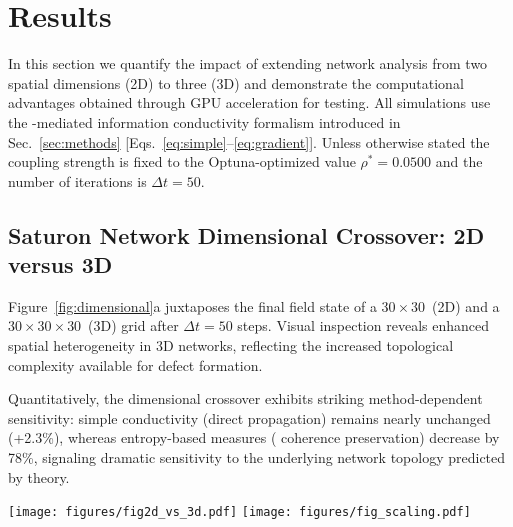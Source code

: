 \section{Results\label{sec:results}}

In this section we quantify the impact of extending \saturon{} network analysis
from two spatial dimensions (2D) to three (3D) and demonstrate the computational 
advantages obtained through GPU acceleration for \posp{} testing. All simulations 
use the \saturon{}-mediated information conductivity formalism introduced in
Sec.~\ref{sec:methods} [Eqs.~\ref{eq:simple}--\ref{eq:gradient}]. Unless otherwise
stated the \saturon{} coupling strength is fixed to the Optuna-optimized value
$\rho^{\ast}=0.0500$ and the number of iterations is $\Delta t=50$.

\subsection{Saturon Network Dimensional Crossover: 2D versus 3D}
Figure~\ref{fig:dimensional}a juxtaposes the final \saturon{} field state of a
$30 \times 30$~(2D) and a $30 \times 30 \times 30$~(3D) grid after
$\Delta t=50$ steps. Visual inspection reveals enhanced spatial heterogeneity 
in 3D \saturon{} networks, reflecting the increased topological complexity 
available for defect formation.

Quantitatively, the dimensional crossover exhibits striking method-dependent 
sensitivity: simple conductivity (direct \saturon{} propagation) remains nearly 
unchanged (+2.3\%), whereas entropy-based measures (\saturon{} coherence 
preservation) decrease by 78\%, signaling dramatic sensitivity to the underlying 
\saturon{} network topology predicted by \posp{} theory.

\begin{figure*}[t]
\centering
\texttt{[image: figures/fig2d\_vs\_3d.pdf]}%
\texttt{[image: figures/fig\_scaling.pdf]}
\caption{(a)~Side‑by‑side comparison of 2D and 3D \saturon{} network end states 
after 50 steps, showing enhanced topological complexity in 3D systems. 
(b)~Throughput scaling with grid size for CPU (blue) and GPU (orange) back‑ends; 
dashed lines indicate ideal $\mathcal{O}(N)$ behavior for \saturon{} dynamics.}
\label{fig:dimensional}
\end{figure*}

